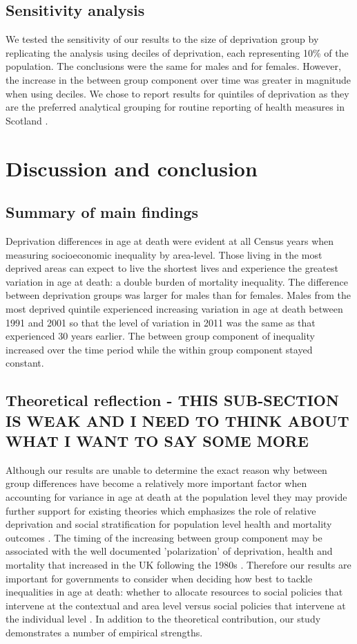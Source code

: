 \documentclass[12pt,oneside,a4paper]{article} %
\theoremstyle{definition}
\begin{document}
\FloatBarrier
\subsection{Sensitivity analysis}
We tested the sensitivity of our results to the size of deprivation group by
replicating the analysis using deciles of deprivation, each representing 10\% of
the population. The conclusions were the same for males and for females.
However, the increase in the between group component over time was greater in
magnitude when using deciles. We chose to report results for quintiles of
deprivation as they are the preferred analytical grouping for routine reporting
of health measures in Scotland \citep{Health2017}.

\section{Discussion and conclusion}

\subsection{Summary of main findings}
Deprivation differences in age at death were evident at all Census years when measuring socioeconomic inequality by area-level. Those living in the most deprived areas can expect to live the shortest lives and experience the greatest variation in age at death: a double burden of mortality inequality. The difference between deprivation groups was larger for males than for females. Males from the most deprived quintile experienced increasing variation in age at death between 1991 and 2001 so that the level of variation in 2011 was the same as that experienced 30 years earlier. The between group component of inequality increased over the time period while the within group component stayed constant.

\subsection{Theoretical reflection - THIS SUB-SECTION IS WEAK AND I NEED TO THINK ABOUT WHAT I WANT TO SAY SOME MORE}
Although our results are unable to determine the exact reason why between group differences have become a relatively more important factor when accounting for variance in age at death at the population level they may provide further support for existing theories which emphasizes the role of relative deprivation and  social stratification for population level health and mortality outcomes \citep{Wilkinson2007,Marmot2001}. The timing of the increasing between group component may be associated with the well documented 'polarization' of deprivation, health and mortality that increased in the UK following the 1980s \citep{Shaw2000,Mitchell2000}. Therefore our results are important for governments to consider when deciding how best to tackle inequalities in age at death: whether to allocate resources to social policies that intervene at the contextual and area level versus social policies that intervene at the individual level  \citep{Allik2016,Roux2001,Robert1999,TheScottishGovernment2016}. In addition to the theoretical contribution, our study demonstrates a number of empirical strengths.   
\end{document}
